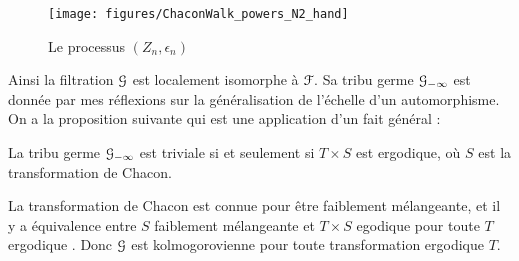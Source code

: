 \documentclass[12pt,a4paper]{article}
\begin{document}
\begin{figure}[!h]
\centering
	\texttt{[image: figures/ChaconWalk\_powers\_N2\_hand]}
\caption{Le processus $(Z_n, \epsilon_n)$}\label{fig:Zn}
\end{figure}

Ainsi la filtration $\EuScript{G}$ est localement isomorphe à $\EuScript{F}$. 
Sa tribu germe $\EuScript{G}_{-\infty}$ est donnée par mes réflexions 
sur la généralisation de l'échelle d'un automorphisme. 
On a la proposition suivante qui est une application d'un fait général : 

\begin{ppsition}
La tribu germe $\EuScript{G}_{-\infty}$ est triviale si et seulement si $T\times S$ est ergodique, 
où $S$ est la transformation de Chacon. 
\end{ppsition}

La transformation de Chacon est connue pour être faiblement mélangeante,  
et il y a équivalence entre \og $S$ faiblement mélangeante \fg{} et 
\og $T\times S$ egodique pour toute $T$ ergodique \fg. 
Donc $\EuScript{G}$ est kolmogorovienne pour toute transformation ergodique $T$. 

\medskip 
\end{document}
